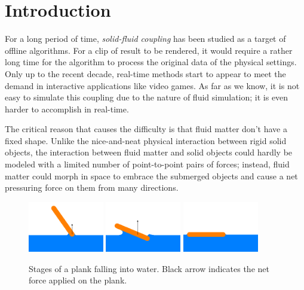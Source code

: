 \section{Introduction}

For a long period of time, \emph{solid-fluid coupling} has been studied as a target of offline algorithms.
For a clip of result to be rendered, it would require a rather long time for the algorithm to process the original data of the physical settings.
Only up to the recent decade, real-time methods start to appear to meet the demand in interactive applications like video games.
As far as we know, it is not easy to simulate this coupling due to the nature of fluid simulation;
it is even harder to accomplish in real-time.

The critical reason that causes the difficulty is that fluid matter don't have a fixed shape.
Unlike the nice-and-neat physical interaction between rigid solid objects, the interaction between fluid matter and solid objects could hardly be modeled with a limited number of point-to-point pairs of forces;
instead, fluid matter could morph in space to embrace the submerged objects and cause a net pressuring force on them from many directions.

\begin{figure}[h]
	\begin{center}
		\includegraphics[width=1.3in]{figures/stages-of-a-plank-falling-into-water/1.png}
		\includegraphics[width=1.3in]{figures/stages-of-a-plank-falling-into-water/2.png}
		\includegraphics[width=1.3in]{figures/stages-of-a-plank-falling-into-water/3.png}
	\end{center}
	\caption{
		Stages of a plank falling into water.
		Black arrow indicates the net force applied on the plank.
	}
	\label{stages-of-a-plank-falling-into-water}
\end{figure}

